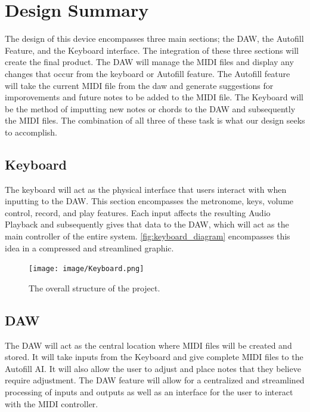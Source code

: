 \section{Design Summary}

The design of this device encompasses three main sections; the DAW, the Autofill Feature,
and the Keyboard interface. The integration of these three sections will create the final
product. The DAW will manage the MIDI files and display any changes that occur from the
keyboard or Autofill feature. The Autofill feature will take the current MIDI file from
the daw and generate suggestions for imporovements and future notes to be added to the
MIDI file. The Keyboard will be the method of imputting new notes or chords to the DAW and
subsequently the MIDI files. The combination of all three of these task is what our design
seeks to accomplish.

\newpage
\subsection{Keyboard}

The keyboard will act as the physical interface that users interact with when inputting to
the DAW. This section encompasses the metronome, keys, volume control, record, and play
features. Each input affects the resulting Audio Playback and subsequently gives that data
to the DAW, which will act as the main controller of the entire system.
\autoref{fig:keyboard_diagram} encompasses this idea in a compressed and streamlined
graphic.

\begin{figure}[h!]
  \centering
  \texttt{[image: image/Keyboard.png]}
  \caption{The overall structure of the project.}
  \label{fig:keyboard_diagram}
\end{figure}

\newpage
\subsection{DAW}

The DAW will act as the central location where MIDI files will be created and stored. It
will take inputs from the Keyboard and give complete MIDI files to the Autofill AI. It
will also allow the user to adjust and place notes that they believe require adjustment.
The DAW feature will allow for a centralized and streamlined processing of inputs and
outputs as well as an interface for the user to interact with the MIDI controller.

